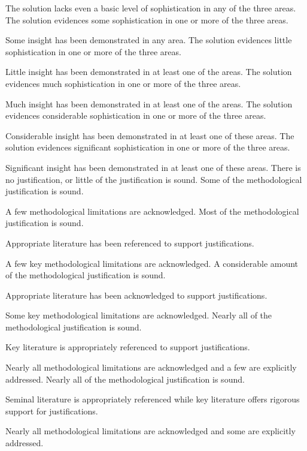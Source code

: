 \documentclass{../../fal_assignment}
\begin{document}
\begin{markingrubric}
        \grade\fail The solution lacks even a basic level of sophistication in any of the three areas.
        \grade The solution evidences some sophistication in one or more of the three areas.
            \par Some insight has been demonstrated in any area.
        \grade The solution evidences little sophistication in one or more of the three areas.
            \par Little insight has been demonstrated in at least one of the areas.
        \grade The solution evidences much sophistication in one or more of the three areas.
            \par Much insight has been demonstrated in at least one of the areas.
        \grade The solution evidences considerable sophistication in one or more of the three areas.
            \par Considerable insight has been demonstrated in at least one of these areas.
        \grade The solution evidences significant sophistication in one or more of the three areas.
            \par Significant insight has been demonstrated in at least one of these areas.
%
        \grade\fail 	There is no justification, or little of the justification is sound.
        \grade 		Some of the methodological justification is sound.
        \par	           A few methodological limitations are acknowledged. 
        \grade 		Most of the methodological justification is sound.
        \par		Appropriate literature has been referenced to support justifications.
        \par 		A few key methodological limitations are acknowledged. 
        \grade 		A considerable amount of the methodological justification is sound.
        \par		Appropriate literature has been acknowledged to support justifications.
        \par 		Some key methodological limitations are acknowledged. 
        \grade 		Nearly all  of the methodological justification is sound.
        \par		Key literature is appropriately referenced to support justifications.
        \par 		Nearly all methodological limitations are acknowledged and a few are explicitly addressed.
        \grade 		Nearly all  of the methodological justification is sound.
        \par		Seminal literature is appropriately referenced while key literature offers rigorous support for justifications.
        \par		Nearly all methodological limitations are acknowledged and some are explicitly addressed.


\end{markingrubric}
\end{document}
